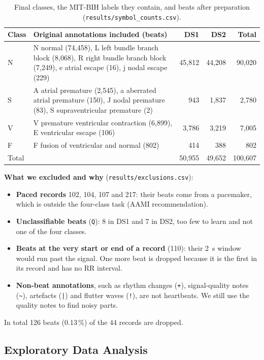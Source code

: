 \documentclass[11pt,a4paper]{article}
\newcommand{\code}[1]{\texttt{#1}}
\begin{document}
\begin{table}[H]
\centering
\small
\caption{Final classes, the MIT-BIH labels they contain, and beats after preparation (\code{results/symbol\_counts.csv}).}
\label{tab:classes}
\begin{tabularx}{\textwidth}{@{} l L r r r @{}}
\toprule
Class & Original annotations included (beats) & DS1 & DS2 & Total \\
\midrule
N & N normal (74,458), L left bundle branch block (8,068), R right bundle branch block (7,249), e atrial escape (16), j nodal escape (229) & 45,812 & 44,208 & 90,020 \\
S & A atrial premature (2,545), a aberrated atrial premature (150), J nodal premature (83), S supraventricular premature (2) & 943 & 1,837 & 2,780 \\
V & V premature ventricular contraction (6,899), E ventricular escape (106) & 3,786 & 3,219 & 7,005 \\
F & F fusion of ventricular and normal (802) & 414 & 388 & 802 \\
\midrule
Total & & 50,955 & 49,652 & 100,607 \\
\bottomrule
\end{tabularx}
\end{table}

\textbf{What we excluded and why} (\code{results/exclusions.csv}):
\begin{itemize}
  \item \textbf{Paced records} 102, 104, 107 and 217: their beats come from a pacemaker, which is outside the four-class task (AAMI recommendation).
  \item \textbf{Unclassifiable beats} (\code{Q}): 8 in DS1 and 7 in DS2, too few to learn and not one of the four classes.
  \item \textbf{Beats at the very start or end of a record} (110): their 2~s window would run past the signal. One more beat is dropped because it is the first in its record and has no RR interval.
  \item \textbf{Non-beat annotations}, such as rhythm changes (\code{+}), signal-quality notes (\code{\textasciitilde}), artefacts (\code{|}) and flutter waves (\code{!}), are not heartbeats. We still use the quality notes to find noisy parts.
\end{itemize}
In total 126 beats (0.13\,\%) of the 44 records are dropped.

\subsection{Exploratory Data Analysis}
\label{sec:eda}
\end{document}

